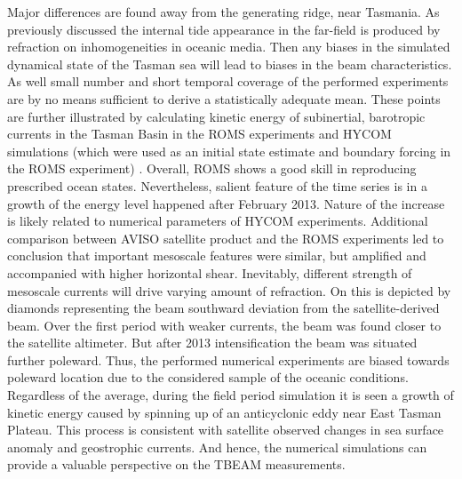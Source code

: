 \documentclass[12pt]{article}
\begin{document}
Major differences are found away from the generating ridge, near Tasmania. As previously discussed 
the internal tide appearance in the far-field is produced by refraction on inhomogeneities in 
oceanic media. Then any biases in the simulated dynamical state of the Tasman sea will lead to 
biases in the beam characteristics. As well small number and short temporal coverage of the 
performed experiments are by no means sufficient to derive a statistically adequate mean. These 
points are further illustrated by calculating kinetic energy of subinertial, barotropic currents in 
the Tasman Basin in the ROMS experiments and HYCOM simulations (which were used as an initial 
state estimate and boundary forcing in the ROMS experiment) . Overall, 
ROMS shows a good skill in reproducing prescribed ocean states. Nevertheless, salient 
feature of the time series is in a growth of the energy level happened after February 2013. Nature 
of the increase is likely related to numerical parameters of HYCOM experiments. Additional 
comparison between AVISO satellite product and the ROMS experiments led to conclusion that 
important mesoscale features were similar, but amplified and accompanied with higher 
horizontal shear. Inevitably, different strength of mesoscale currents will drive varying amount of 
refraction. On  this is depicted by diamonds representing the beam southward 
deviation from the satellite-derived beam. Over the first period with weaker currents, the beam was 
found closer to the satellite altimeter. But after 2013 intensification the beam was situated 
further poleward. Thus, the performed numerical experiments are biased towards poleward location 
due to the considered sample of the oceanic conditions. Regardless of the average, during the field 
period simulation  it is seen a growth of kinetic energy caused by 
spinning up of an anticyclonic eddy near East Tasman Plateau. This process is consistent with 
satellite observed changes in sea surface anomaly and geostrophic currents. And hence, the 
numerical simulations can provide a valuable perspective on the TBEAM measurements.\\
\end{document}
